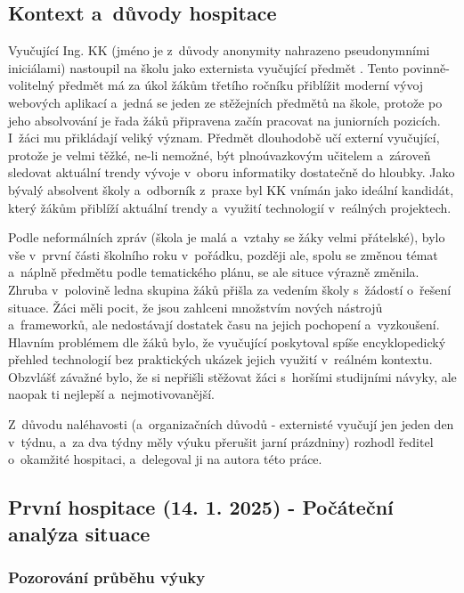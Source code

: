\subsection{Kontext a~důvody hospitace}

Vyučující Ing. KK (jméno je z~důvody anonymity nahrazeno pseudonymními iniciálami) nastoupil na školu jako externista vyučující předmět . Tento povinně-volitelný předmět má za úkol žákům třetího ročníku přiblížit moderní vývoj webových aplikací a~jedná se jeden ze stěžejních předmětů na škole, protože po jeho absolvování je řada žáků připravena začín pracovat na juniorních pozicích. I~žáci mu přikládají veliký význam. Předmět dlouhodobě učí externí vyučující, protože je velmi těžké, ne-li nemožné, být plnoúvazkovým učitelem a~zároveň sledovat aktuální trendy vývoje v~oboru informatiky dostatečně do hloubky. Jako bývalý absolvent školy a~odborník z~praxe byl KK vnímán jako ideální kandidát, který žákům přiblíží aktuální trendy a~využití technologií v~reálných projektech.

Podle neformálních zpráv (škola je malá a~vztahy se žáky velmi přátelské), bylo vše v~první části školního roku v~pořádku, později ale, spolu se změnou témat a~náplně předmětu podle tematického plánu, se ale situce výrazně změnila. Zhruba v~polovině ledna skupina žáků přišla za vedením školy s~žádostí o~řešení situace. Žáci měli pocit, že jsou zahlceni množstvím nových nástrojů a~frameworků, ale nedostávají dostatek času na jejich pochopení a~vyzkoušení. Hlavním problémem dle žáků bylo, že vyučující poskytoval spíše encyklopedický přehled technologií bez praktických ukázek jejich využití v~reálném kontextu. Obzvlášť závažné bylo, že si nepřišli stěžovat žáci s~horšími studijními návyky, ale naopak ti nejlepší a~nejmotivovanější.

Z~důvodu naléhavosti (a~organizačních důvodů - externisté vyučují jen jeden den v~týdnu, a~za dva týdny měly výuku přerušit jarní prázdniny) rozhodl ředitel o~okamžité hospitaci, a~delegoval ji na autora této práce.


\subsection{První hospitace (14. 1. 2025) - Počáteční analýza situace}

\subsubsection*{Pozorování průběhu výuky}

